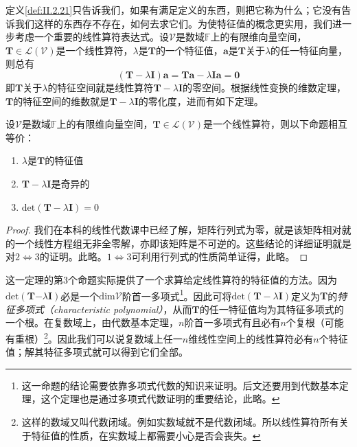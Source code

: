 \documentclass[main.tex]{subfiles}
\begin{document}
定义\ref{def:II.2.21}只告诉我们，如果有满足定义的东西，则把它称为什么；它没有告诉我们这样的东西存不存在，如何去求它们。为使特征值的概念更实用，我们进一步考虑一个重要的线性算符表达式。设$\mathcal{V}$是数域$\mathbb{F}$上的有限维向量空间，$\mathbf{T}\in\mathcal{L}\left(\mathcal{V}\right)$是一个线性算符，$\lambda$是$\mathbf{T}$的一个特征值，$\mathbf{a}$是$\mathbf{T}$关于$\lambda$的任一特征向量，则总有
\[\left(\mathbf{T}-\lambda\mathbf{I}\right)\mathbf{a}=\mathbf{Ta}-\lambda\mathbf{Ia}=\mathbf{0}\]
即$\mathbf{T}$关于$\lambda$的特征空间就是线性算符$\mathbf{T}-\lambda\mathbf{I}$的零空间。根据线性变换的维数定理，$\mathbf{T}$的特征空间的维数就是$\mathbf{T}-\lambda\mathbf{I}$的零化度，进而有如下定理。

\begin{theorem}\label{thm:II.2.27}
    设$\mathcal{V}$是数域$\mathbb{F}$上的有限维向量空间，$\mathbf{T}\in\mathcal{L}\left(\mathcal{V}\right)$是一个线性算符，则以下命题相互等价：
    \begin{enumerate}
        \item $\lambda$是$\mathbf{T}$的特征值
        \item $\mathbf{T}-\lambda\mathbf{I}$是奇异的
        \item $\mathrm{det}\left(\mathbf{T}-\lambda\mathbf{I}\right)=0$
    \end{enumerate}
    \begin{proof}
        我们在本科的线性代数课中已经了解，矩阵行列式为零，就是该矩阵相对就的一个线性方程组无非全零解，亦即该矩阵是不可逆的。这些结论的详细证明就是对$2\Leftrightarrow 3$的证明。此略。$1\Leftrightarrow 3$可利用行列式的性质简单证得，此略。
    \end{proof}
\end{theorem}

这一定理的第3个命题实际提供了一个求算给定线性算符的特征值的方法。因为$\mathrm{det}\left(\mathbf{T}\right.$$\left.-\lambda\mathbf{I}\right)$必是一个$\mathrm{dim}\mathcal{V}$阶首一多项式\footnote{这一命题的结论需要依靠多项式代数的知识来证明。后文还要用到代数基本定理，这个定理也是通过多项式代数证明的重要结论，此略\cite{Hoffman1971}。}。因此可将$\mathrm{det}\left(\mathbf{T}-\lambda\mathbf{I}\right)$定义为$\mathbf{T}$的\emph{特征多项式}\emph{（characteristic polynomial）}，从而$\mathbf{T}$的任一特征值均为其特征多项式的一个根。在复数域上，由代数基本定理，$n$阶首一多项式有且必有$n$个复根（可能有重根）\footnote{这样的数域又叫代数闭域。例如实数域就不是代数闭域。所以线性算符所有关于特征值的性质，在实数域上都需要小心是否会丧失。}。因此我们可以说复数域上任一$n$维线性空间上的线性算符必有$n$个特征值；解其特征多项式就可以得到它们全部。
\end{document}
